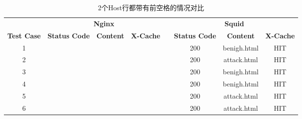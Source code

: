 \begin{table}
	\renewcommand\arraystretch{1.1}      %
	\caption{2个Host行都带有前空格的情况对比}
	\vspace{1.2mm}                  %
	\centering                            %
	{\tabcolsep  0.05in                    %
		\begin{tabular}{cccccccc}
			\hline
			& \multicolumn{3}{c}{\textbf{Nginx}} & & \multicolumn{3}{c}{\textbf{Squid}}\\
			\cline{2-4}\cline{6-8}
			\textbf{Test Case}& \textbf{Status Code} & \textbf{Content}  & \textbf{X-Cache}  & &  \textbf{Status Code}  & \textbf{Content} & \textbf{X-Cache}\\
			\hline
			1 &   {\color{red}{400}} &  {\color{red}{Bad Request}} &    & &  200  &  benigh.html  &  HIT \\
			2 &  {\color{red}{400}} &  {\color{red}{Bad Request}}  &    & &  200  &  attack.html  &  HIT \\
			3 &  {\color{red}{400}}  &  {\color{red}{Bad Request}} &    & &  200  &  benigh.html  &  HIT \\
			4 &  {\color{red}{400}} &  {\color{red}{Bad Request}} &        & &  200 & benigh.html   &  HIT \\
			5 &  {\color{red}{400}} &  {\color{red}{Bad Request}} &    & &  200 &  attack.html  &  HIT \\
			6 &  {\color{red}{400}} &  {\color{red}{Bad Request}}  &      & &  200 & attack.html     &  HIT \\
			\hline
		\end{tabular}
	}
\end{table}

